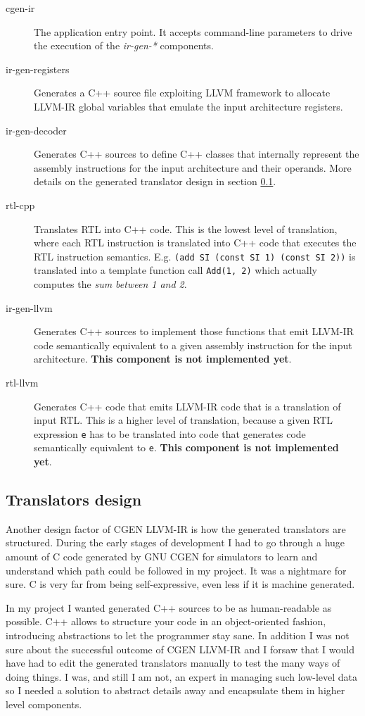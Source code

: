 \documentclass{article}
\begin{document}
\begin{description}
\item[cgen-ir] The application entry point. It accepts command-line parameters to drive the execution of the \emph{ir-gen-*} components.
\item[ir-gen-registers] Generates a C++ source file exploiting LLVM framework to allocate LLVM-IR global variables that emulate the input architecture registers.
\item[ir-gen-decoder] Generates C++ sources to define C++ classes that internally represent the assembly instructions for the input architecture and their operands. More details on the generated translator design in section \ref{sec:cpp-trans}.
\item[rtl-cpp] Translates RTL into C++ code. This is the lowest level of translation, where each RTL instruction is translated into C++ code that executes the RTL instruction semantics. E.g. \texttt{(add SI (const SI 1) (const SI 2))} is translated into a template function call \texttt{Add(1, 2)} which actually computes the \emph{sum between 1 and 2}.
\item[ir-gen-llvm] Generates C++ sources to implement those functions that emit LLVM-IR code semantically equivalent to a given assembly instruction for the input architecture. \textbf{This component is not implemented yet}.
\item[rtl-llvm] Generates C++ code that emits LLVM-IR code that is a translation of input RTL. This is a higher level of translation, because a given RTL expression \texttt{e} has to be translated into code that generates code semantically equivalent to \texttt{e}. \textbf{This component is not implemented yet}.
\end{description}

\subsection{Translators design} \label{sec:cpp-trans}
Another design factor of CGEN LLVM-IR is how the generated translators are structured. During the early stages of development I had to go through a huge amount of C code generated by GNU CGEN for simulators to learn and understand which path could be followed in my project. It was a nightmare for sure. C is very far from being self-expressive, even less if it is machine generated.

In my project I wanted generated C++ sources to be as human-readable as possible. C++ allows to structure your code in an object-oriented fashion, introducing abstractions to let the programmer stay sane. In addition I was not sure about the successful outcome of CGEN LLVM-IR and I forsaw that I would have had to edit the generated translators manually to test the many ways of doing things. I was, and still I am not, an expert in managing such low-level data so I needed a solution to abstract details away and encapsulate them in higher level components.
\end{document}
